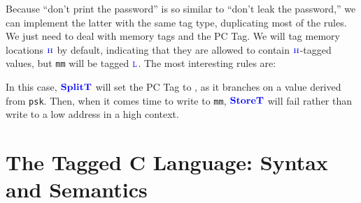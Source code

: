 \documentclass{llncs}
\begin{document}
{Because ``don't print the password'' is so similar to ``don't leak the password,'' we can
implement the latter with the same tag type, duplicating most of the rules. We just need to
deal with memory tags and the PC Tag. We will tag memory
locations \(\textnormal{\color{blue} \sc h}\) by default, indicating that they are allowed to contain \(\textnormal{\color{blue} \sc h}\)-tagged values,
but {\tt mm} will be tagged \(\textnormal{\color{blue} \sc l}\). The most interesting rules are:

\begin{figure}
\end{figure}

In this case, \(\color{blue} \mathbf{SplitT}\) will set the PC Tag to \high, as it branches on a value derived from {\tt psk}.
Then, when it comes time to write to {\tt mm}, \(\color{blue} \mathbf{StoreT}\) will fail rather than write to a low address
in a high context.

\section{The Tagged C Language: Syntax and Semantics}
\label{sec:language}

}
\end{document}
